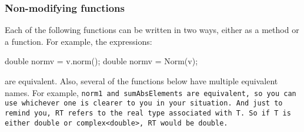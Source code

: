 \subsubsection{Non-modifying functions}

Each of the following functions can be written in two ways, either as a method or a function.
For example, the expressions:
\begin{tmvcode}
double normv = v.norm();
double normv = Norm(v);
\end{tmvcode}
are equivalent.
Also, several of the functions below have multiple equivalent names.  For example,
\tt{norm1} and \tt{sumAbsElements} are equivalent, so you can use whichever one is
clearer to you in your situation.  And just to remind you, \tt{RT} refers to the 
real type associated with \tt{T}.  So if \tt{T} is either \tt{double} or \tt{complex<double>},
\tt{RT} would be \tt{double}.

